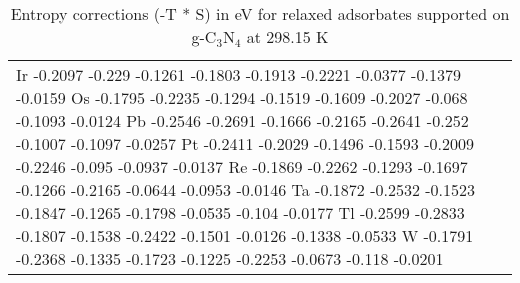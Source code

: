 \begin{table}[h]
\begin{tabular}{lr}
      Ir	-0.2097	-0.229	-0.1261	-0.1803	-0.1913	-0.2221	-0.0377	-0.1379	-0.0159
      Os	-0.1795	-0.2235	-0.1294	-0.1519	-0.1609	-0.2027	-0.068	-0.1093	-0.0124
      Pb	-0.2546	-0.2691	-0.1666	-0.2165	-0.2641	-0.252	-0.1007	-0.1097	-0.0257
      Pt	-0.2411	-0.2029	-0.1496	-0.1593	-0.2009	-0.2246	-0.095	-0.0937	-0.0137
      Re	-0.1869	-0.2262	-0.1293	-0.1697	-0.1266	-0.2165	-0.0644	-0.0953	-0.0146
      Ta	-0.1872	-0.2532	-0.1523	-0.1847	-0.1265	-0.1798	-0.0535	-0.104	-0.0177
      Tl	-0.2599	-0.2833	-0.1807	-0.1538	-0.2422	-0.1501	-0.0126	-0.1338	-0.0533
      W	  -0.1791	-0.2368	-0.1335	-0.1723	-0.1225	-0.2253	-0.0673	-0.118	-0.0201
      \hline
    \end{tabular}
    \caption{Entropy corrections (-T * S) in eV for relaxed adsorbates supported on g-C$_3$N$_4$ at 298.15 K}
    \label{si_table8}
\end{table}


